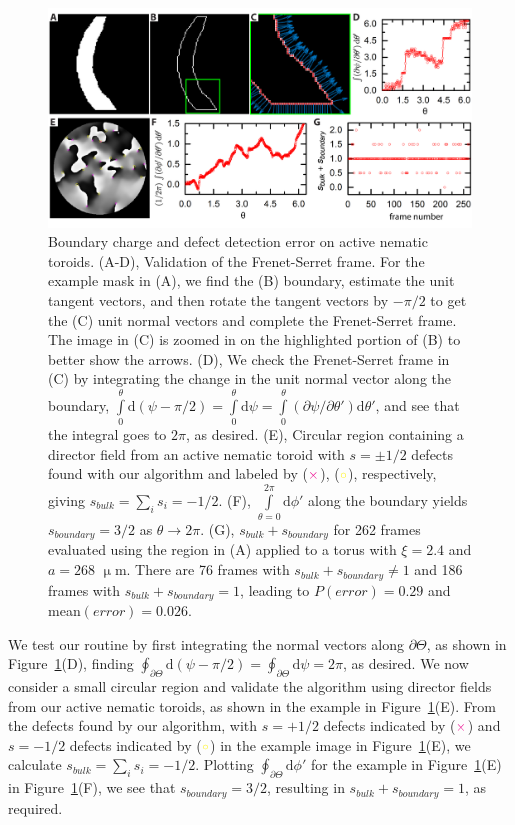 \begin{figure}
  \centering
  \includegraphics{figures/C3/Ch3-Figs_EdgeChargeErr.png}
  \caption{Boundary charge and defect detection error on active nematic toroids.
  (A-D), Validation of the Frenet-Serret frame.
  For the example mask in (A), we find the (B) boundary, estimate the unit tangent vectors, and then rotate the tangent vectors by $-\pi/2$ to get the (C) unit normal vectors and complete the Frenet-Serret frame.
  The image in (C) is zoomed in on the highlighted portion of (B) to better show the arrows.
  (D), We check the Frenet-Serret frame in (C) by integrating the change in the unit normal vector along the boundary, $\int\limits_{0}^{\theta} \textrm{d}(\psi - \pi/2) = \int\limits_{0}^{\theta} \textrm{d}\psi = \int\limits_{0}^{\theta} (\partial \psi/\partial \theta') \textrm{d}\theta'$, and see that the integral goes to $2 \pi$, as desired.
  (E), Circular region containing a director field from an active nematic toroid with $s = \pm 1/2$ defects found with our algorithm and labeled by (${\color{magenta} \times}$), (${\color{yellow} \circ}$), respectively, giving $s_{bulk} = \sum_i s_i = -1/2$.
  (F), $\int\limits_{\theta = 0}^{2\pi} \textrm{d}\phi'$ along the boundary yields $s_{boundary} = 3/2$ as $\theta \rightarrow 2 \pi$.
  (G), $s_{bulk} + s_{boundary}$ for 262 frames evaluated using the region in (A) applied to a torus with $\xi = 2.4$ and $a = 268$ $\upmu$m.
  There are 76 frames with $s_{bulk} + s_{boundary} \neq 1$ and 186 frames with $s_{bulk} + s_{boundary} = 1$, leading to $P(error) = 0.29$ and mean$(error) = 0.026$.}\label{f:3-EdgeChargeErr}
\end{figure}

We test our routine by first integrating the normal vectors along $\partial \Theta$, as shown in Figure~\ref{f:3-EdgeChargeErr}(D), finding $\oint_{\partial \Theta} \textrm{d}(\psi-\pi/2) = \oint_{\partial \Theta} \textrm{d}\psi = 2\pi$, as desired.
We now consider a small circular region and validate the algorithm using director fields from our active nematic toroids, as shown in the example in Figure~\ref{f:3-EdgeChargeErr}(E).
From the defects found by our algorithm, with $s = +1/2$ defects indicated by (${\color{magenta} \times}$) and $s = -1/2$ defects indicated by (${\color{yellow} \circ}$) in the example image in Figure~\ref{f:3-EdgeChargeErr}(E), we calculate $s_{bulk}= \sum\limits_i s_i=-1/2$.
Plotting $\oint_{\partial \Theta} \textrm{d}\phi'$ for the example in Figure~\ref{f:3-EdgeChargeErr}(E) in Figure~\ref{f:3-EdgeChargeErr}(F), we see that $s_{boundary} = 3/2$, resulting in $s_{bulk}+s_{boundary} = 1$, as required.

